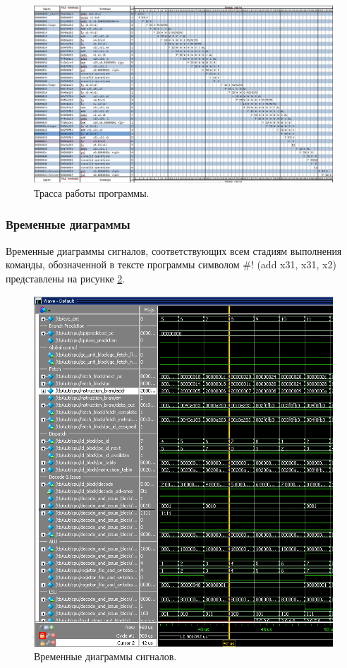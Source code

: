 \begin{figure}[h]
	\centering
	\includegraphics[height=0.4\textheight]{img/t5-trasa-01}
	\caption{Трасса работы программы.}
	\label{img:t5-trasa-01}
\end{figure}

\clearpage

\subsubsection*{Временные диаграммы}
Временные диаграммы сигналов, соответствующих всем стадиям выполнения команды, обозначенной в тексте программы символом \#! (add x31, x31, x2) представлены на рисунке \ref{img:t5-modelsim}.
\begin{figure}[h]
	\centering
	\includegraphics[height=0.6\textheight]{img/t5-modelsim}
	\caption{Временные диаграммы сигналов.}
	\label{img:t5-modelsim}
\end{figure}

